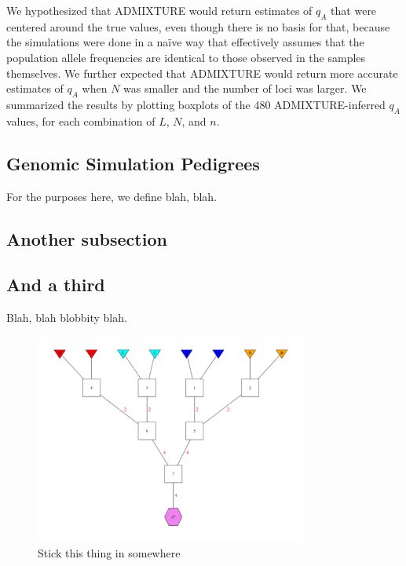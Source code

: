 We hypothesized that ADMIXTURE would return estimates of $q_A$ that were
centered around the true values, even though there is no basis for that, because
the simulations were done in a na\"{i}ve way that effectively assumes that the population
allele frequencies are identical to those observed in the samples themselves. 
We further expected that ADMIXTURE would return more accurate estimates of
$q_A$ when $N$ was smaller and the number of loci was larger.
We summarized the results by plotting boxplots of the 480
ADMIXTURE-inferred $q_A$ values, for each combination of $L$, $N$, and $n$.




\subsection*{Genomic Simulation Pedigrees}

For the purposes here, we define blah, blah.

\subsection*{Another subsection}



\subsection*{And a third}

Blah, blah blobbity blah.


\begin{figure}
\begin{center}
\includegraphics[width=0.8\textwidth]{images/gsp4-700.pdf}
\end{center}
\caption[]{Stick this thing in somewhere}
\end{figure}


